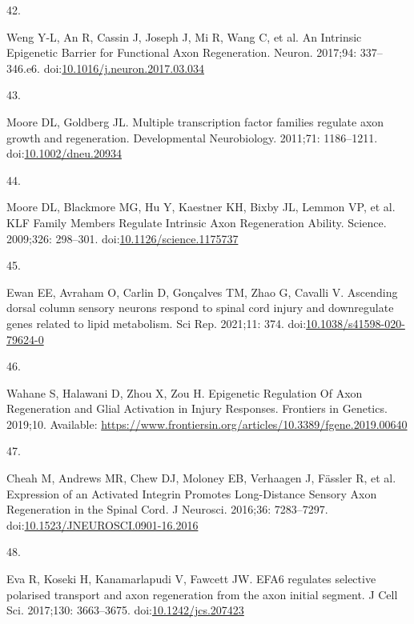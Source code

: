 \documentclass[
  12pt,
  a4paper,
]{book}
\newlength{\cslhangindent}
\newlength{\csllabelwidth}
\newlength{\cslentryspacingunit} %
\newenvironment{CSLReferences}[2] %
 {%
  \setlength{\parindent}{0pt}
  \ifodd #1
  \let\oldpar\par
  \def\par{\hangindent=\cslhangindent\oldpar}
  \fi
  \setlength{\parskip}{#2\cslentryspacingunit}
 }%
 {}
\newcommand{\CSLLeftMargin}[1]{\parbox[t]{\csllabelwidth}{#1}}
\newcommand{\CSLRightInline}[1]{\parbox[t]{\linewidth - \csllabelwidth}{#1}\break}
\begin{document}
\begin{CSLReferences}{0}{0}
\leavevmode{}%
\CSLLeftMargin{42. }%
\CSLRightInline{Weng Y-L, An R, Cassin J, Joseph J, Mi R, Wang C, et al. An {Intrinsic Epigenetic Barrier} for {Functional Axon Regeneration}. Neuron. 2017;94: 337--346.e6. doi:\href{https://doi.org/10.1016/j.neuron.2017.03.034}{10.1016/j.neuron.2017.03.034}}

\leavevmode{}%
\CSLLeftMargin{43. }%
\CSLRightInline{Moore DL, Goldberg JL. Multiple transcription factor families regulate axon growth and regeneration. Developmental Neurobiology. 2011;71: 1186--1211. doi:\href{https://doi.org/10.1002/dneu.20934}{10.1002/dneu.20934}}

\leavevmode{}%
\CSLLeftMargin{44. }%
\CSLRightInline{Moore DL, Blackmore MG, Hu Y, Kaestner KH, Bixby JL, Lemmon VP, et al. {KLF Family Members Regulate Intrinsic Axon Regeneration Ability}. Science. 2009;326: 298--301. doi:\href{https://doi.org/10.1126/science.1175737}{10.1126/science.1175737}}

\leavevmode{}%
\CSLLeftMargin{45. }%
\CSLRightInline{Ewan EE, Avraham O, Carlin D, Gonçalves TM, Zhao G, Cavalli V. Ascending dorsal column sensory neurons respond to spinal cord injury and downregulate genes related to lipid metabolism. Sci Rep. 2021;11: 374. doi:\href{https://doi.org/10.1038/s41598-020-79624-0}{10.1038/s41598-020-79624-0}}

\leavevmode{}%
\CSLLeftMargin{46. }%
\CSLRightInline{Wahane S, Halawani D, Zhou X, Zou H. Epigenetic {Regulation Of Axon Regeneration} and {Glial Activation} in {Injury Responses}. Frontiers in Genetics. 2019;10. Available: \url{https://www.frontiersin.org/articles/10.3389/fgene.2019.00640}}

\leavevmode{}%
\CSLLeftMargin{47. }%
\CSLRightInline{Cheah M, Andrews MR, Chew DJ, Moloney EB, Verhaagen J, Fässler R, et al. Expression of an {Activated Integrin Promotes Long-Distance Sensory Axon Regeneration} in the {Spinal Cord}. J Neurosci. 2016;36: 7283--7297. doi:\href{https://doi.org/10.1523/JNEUROSCI.0901-16.2016}{10.1523/JNEUROSCI.0901-16.2016}}

\leavevmode{}%
\CSLLeftMargin{48. }%
\CSLRightInline{Eva R, Koseki H, Kanamarlapudi V, Fawcett JW. {EFA6} regulates selective polarised transport and axon regeneration from the axon initial segment. J Cell Sci. 2017;130: 3663--3675. doi:\href{https://doi.org/10.1242/jcs.207423}{10.1242/jcs.207423}}


\end{CSLReferences}
\end{document}
